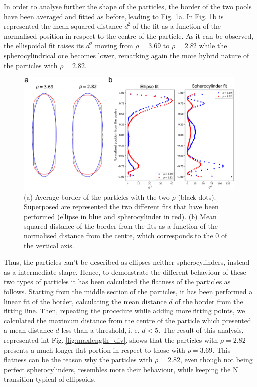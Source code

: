 \documentclass[aip,graphicx]{revtex4-1}
\begin{document}
In order to analyse further the shape of the particles, the border of the two pools have been averaged and fitted as before, leading to Fig. \ref{fig:Mean_bord}a. In Fig. \ref{fig:Mean_bord}b is represented the mean squared distance $d^2$ of the fit as a function of the normalised position in respect to the centre of the particle. As it can be observed, the ellispoidal fit raises its $d^2$ moving from $\rho=3.69$ to $\rho=2.82$ while the spherocylindrical one becomes lower, remarking again the more hybrid nature of the particles with $\rho=2.82$.

\begin{figure}
    \centering
    \includegraphics[width=0.7\columnwidth]{Mean_bord.png}
    \caption{(a) Average border of the particles with the two $\rho$ (black dots). Superposed are represented the two different fits that have been performed (ellipse in blue and spherocylinder in red). (b) Mean squared distance of the border from the fits as a function of the normalised distance from the centre, which corresponds to the $0$ of the vertical axis.}
    \label{fig:Mean_bord}
\end{figure}

Thus, the particles can't be described as ellipses neither spherocylinders, instead as a intermediate shape. Hence, to demonstrate the different behaviour of these two types of particles it has been calculated the flatness of the particles as follows. Starting from the middle section of the particles, it has been performed a linear fit of the border, calculating the mean distance $d$ of the border from the fitting line. Then, repeating the procedure while adding more fitting points, we calculated the maximum distance from the centre of the particle which presented a mean distance $d$ less than a threshold, i. e. $d < 5$. The result of this analysis, represented int Fig. \ref{fig:maxlength_div}, shows that the particles with $\rho=2.82$ presents a much longer flat portion in respect to those with $\rho=3.69$. This flatness can be the reason why the particles with $\rho=2.82$, even though not being perfect spherocylinders, resembles more their behaviour, while keeping the N transition typical of ellipsoids. 
\end{document}
